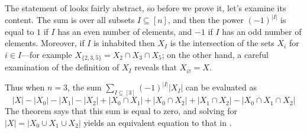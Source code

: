 The statement of  looks fairly abstract, so before we prove it, let's examine its content. The sum is over all subsets $I \subseteq [n]$, and then the power $(-1)^{|I|}$ is equal to $1$ if $I$ has an even number of elements, and $-1$ if $I$ has an odd number of elements. Moreover, if $I$ is inhabited then $X_I$ is the intersection of the sets $X_i$ for $i \in I$---for example $X_{\{2,3,5\}} = X_2 \cap X_3 \cap X_5$; on the other hand, a careful examination of the definition of $X_I$ reveals that $X_{\varnothing} = X$.

Thus when $n=3$, the sum $\sum_{I \subseteq [3]} (-1)^{|I|} |X_I|$ can be evaluated as
\[ |X| - |X_0| - |X_1| - |X_2| + |X_0 \cap X_1| + |X_0 \cap X_2| + |X_1 \cap X_2| - |X_0 \cap X_1 \cap X_2| \]
The theorem says that this sum is equal to zero, and solving for $|X| = |X_0 \cup X_1 \cup X_2|$ yields an equivalent equation to that in .

